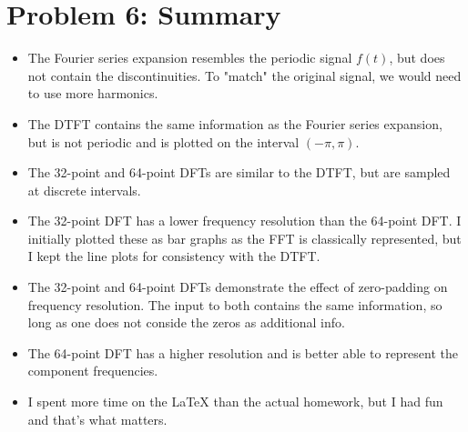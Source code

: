 \documentclass[12pt]{article}
\begin{document}
\section*{Problem 6: Summary}
\begin{itemize}
    \item The Fourier series expansion resembles the periodic signal $f(t)$, but does not contain the discontinuities. To "match" the original signal, we would need to use more harmonics.
    \item The DTFT contains the same information as the Fourier series expansion, but is not periodic and is plotted on the interval $(-\pi, \pi)$.
    \item The 32-point and 64-point DFTs are similar to the DTFT, but are sampled at discrete intervals.
    \item The 32-point DFT has a lower frequency resolution than the 64-point DFT. I initially plotted these as bar graphs as the FFT is classically represented, but I kept the line plots for consistency with the DTFT. 
    \item The 32-point and 64-point DFTs demonstrate the effect of zero-padding on frequency resolution. The input to both contains the same information, so long as one does not conside the zeros as additional info. 
    \item The 64-point DFT has a higher resolution and is better able to represent the component frequencies.
    \item I spent more time on the \LaTeX{} than the actual homework, but I had fun and that's what matters.
\end{itemize}
\end{document}
